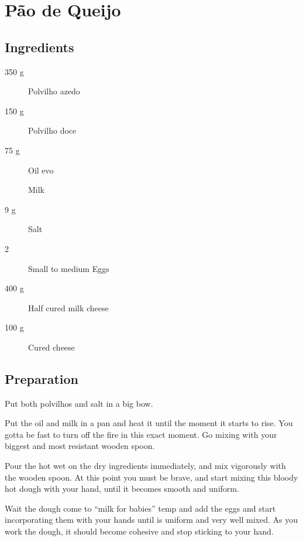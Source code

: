 \setchapterpreamble[u]{\margintoc}
\chapter{Pão de Queijo}

\section{Ingredients}

\begin{multicols}{2}
\begin{description}
	\item[350 g] Polvilho azedo
	\item[150 g] Polvilho doce
	\item[75 g] Oil \gls{evo}
	\item[] Milk
	\item[9 g] Salt
	\item[2 ] Small to medium Eggs
	\item[400 g] Half cured milk cheese
	\item[100 g] Cured cheese
\end{description}
\end{multicols}

\section{Preparation}
Put both polvilhos and salt in a big bow.

Put the oil and milk in a pan and heat it until the moment it starts to rise. You gotta be fast to turn off the fire in this exact moment. 
%
Go mixing with your biggest and most resistant wooden spoon.

Pour the hot wet on the dry ingredients immediately, and mix vigorously with the wooden spoon.
%
At this point you must be brave, and start mixing this bloody hot dough with your hand, until it becomes smooth and uniform.

Wait the dough come to ``milk for babies'' temp and add the eggs and start incorporating them with your hands until is uniform and very well mixed.
%
As you work the dough, it should become cohesive and stop sticking to your hand.

